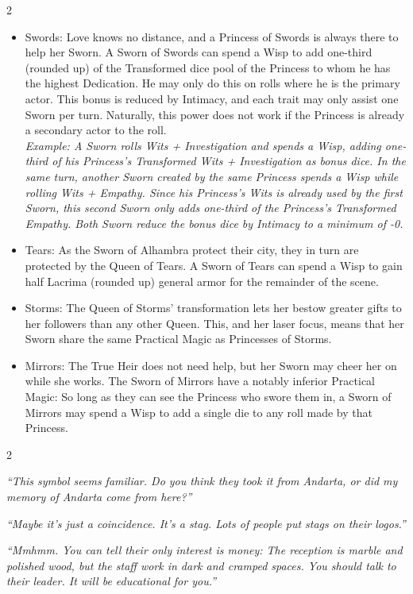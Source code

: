 \begin{multicols}{2}
\begin{itemize}
\item Swords: Love knows no distance, and a Princess of Swords is always there to help her Sworn. A Sworn of Swords can spend a Wisp to add one-third (rounded up) of the Transformed dice pool of the Princess to whom he has the highest Dedication. He may only do this on rolls where he is the primary actor. This bonus is reduced by Intimacy, and each trait may only assist one Sworn per turn. Naturally, this power does not work if the Princess is already a secondary actor to the roll. \\ \textit{Example: A Sworn rolls Wits + Investigation and spends a Wisp, adding one-third of his Princess's Transformed Wits + Investigation as bonus dice. In the same turn, another Sworn created by the same Princess spends a Wisp while rolling Wits + Empathy. Since his Princess's Wits is already used by the first Sworn, this second Sworn only adds one-third of the Princess's Transformed Empathy. Both Sworn reduce the bonus dice by Intimacy to a minimum of -0.}
\item Tears: As the Sworn of Alhambra protect their city, they in turn are protected by the Queen of Tears. A Sworn of Tears can spend a Wisp to gain half Lacrima (rounded up) general armor for the remainder of the scene. 
\item Storms: The Queen of Storms' transformation lets her bestow greater gifts to her followers than any other Queen. This, and her laser focus, means that her Sworn share the same Practical Magic as Princesses of Storms. 
\item Mirrors: The True Heir does not need help, but her Sworn may cheer her on while she works. The Sworn of Mirrors have a notably inferior Practical Magic: So long as they can see the Princess who swore them in, a Sworn of Mirrors may spend a Wisp to add a single die to any roll made by that Princess.
\end{itemize}

\end{multicols}\label{scha:Shikigami}\begin{multicols}{2}\raggedcolumns

\noindent \textit{“This symbol seems familiar. Do you think they took it from Andarta, or did my memory of Andarta come from here?”}

\textit{“Maybe it's just a coincidence. It's a stag. Lots of people put stags on their logos.”}

\textit{“Mmhmm. You can tell their only interest is money: The reception is marble and polished wood, but the staff work in dark and cramped spaces. You should talk to their leader. It will be educational for you.”}


\end{multicols}
